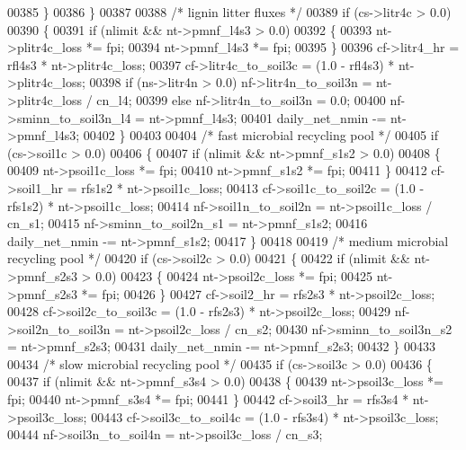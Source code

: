\begin{DoxyCode}
00385         \}
00386     \}
00387 
00388     \textcolor{comment}{/* lignin litter fluxes */}
00389     \textcolor{keywordflow}{if} (cs->litr4c > 0.0)
00390     \{
00391         \textcolor{keywordflow}{if} (nlimit && nt->pmnf\_l4s3 > 0.0)
00392         \{
00393             nt->plitr4c\_loss *= fpi;
00394             nt->pmnf\_l4s3 *= fpi;
00395         \}
00396         cf->litr4\_hr = rfl4s3 * nt->plitr4c\_loss;
00397         cf->litr4c\_to\_soil3c = (1.0 - rfl4s3) * nt->plitr4c\_loss;
00398         if (ns->litr4n > 0.0) nf->litr4n\_to\_soil3n = nt->plitr4c\_loss / cn\_l4;
00399         \textcolor{keywordflow}{else} nf->litr4n\_to\_soil3n = 0.0;
00400         nf->sminn\_to\_soil3n\_l4 = nt->pmnf\_l4s3;
00401         daily\_net\_nmin -= nt->pmnf\_l4s3;
00402     \}
00403     
00404     \textcolor{comment}{/* fast microbial recycling pool */}
00405     \textcolor{keywordflow}{if} (cs->soil1c > 0.0)
00406     \{
00407         \textcolor{keywordflow}{if} (nlimit && nt->pmnf\_s1s2 > 0.0)
00408         \{
00409             nt->psoil1c\_loss *= fpi;
00410             nt->pmnf\_s1s2 *= fpi;
00411         \}
00412         cf->soil1\_hr = rfs1s2 * nt->psoil1c\_loss;
00413         cf->soil1c\_to\_soil2c = (1.0 - rfs1s2) * nt->psoil1c\_loss;
00414         nf->soil1n\_to\_soil2n = nt->psoil1c\_loss / cn\_s1;
00415         nf->sminn\_to\_soil2n\_s1 = nt->pmnf\_s1s2;
00416         daily\_net\_nmin -= nt->pmnf\_s1s2;
00417     \}
00418     
00419     \textcolor{comment}{/* medium microbial recycling pool */}
00420     \textcolor{keywordflow}{if} (cs->soil2c > 0.0)
00421     \{
00422         \textcolor{keywordflow}{if} (nlimit && nt->pmnf\_s2s3 > 0.0)
00423         \{
00424             nt->psoil2c\_loss *= fpi;
00425             nt->pmnf\_s2s3 *= fpi;
00426         \}
00427         cf->soil2\_hr = rfs2s3 * nt->psoil2c\_loss;
00428         cf->soil2c\_to\_soil3c = (1.0 - rfs2s3) * nt->psoil2c\_loss;
00429         nf->soil2n\_to\_soil3n = nt->psoil2c\_loss / cn\_s2;
00430         nf->sminn\_to\_soil3n\_s2 = nt->pmnf\_s2s3;
00431         daily\_net\_nmin -= nt->pmnf\_s2s3;
00432     \}
00433 
00434     \textcolor{comment}{/* slow microbial recycling pool */}
00435     \textcolor{keywordflow}{if} (cs->soil3c > 0.0)
00436     \{
00437         \textcolor{keywordflow}{if} (nlimit && nt->pmnf\_s3s4 > 0.0)
00438         \{
00439             nt->psoil3c\_loss *= fpi;
00440             nt->pmnf\_s3s4 *= fpi;
00441         \}
00442         cf->soil3\_hr = rfs3s4 * nt->psoil3c\_loss;
00443         cf->soil3c\_to\_soil4c = (1.0 - rfs3s4) * nt->psoil3c\_loss;
00444         nf->soil3n\_to\_soil4n = nt->psoil3c\_loss / cn\_s3;

\end{DoxyCode}
